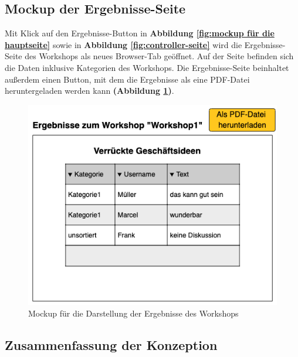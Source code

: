 \subsection{Mockup der Ergebnisse-Seite}
\label{subsec:mockup der ergebnisse-seite}
Mit Klick auf den Ergebnisse-Button in \textbf{Abbildung \ref{fig:mockup für die hauptseite}} sowie in \textbf{Abbildung \ref{fig:controller-seite}} wird die Ergebnisse-Seite des Workshops als neues Browser-Tab geöffnet. Auf der Seite befinden sich die Daten inklusive Kategorien des Workshops. Die Ergebnisse-Seite beinhaltet außerdem einen Button, mit dem die Ergebnisse als eine PDF-Datei heruntergeladen werden kann \textbf{(Abbildung \ref{fig:mockup für die darstellung der ergebnisse des workshops})}.

\begin{figure}[H]
  \begin{center}
    \includegraphics[scale=0.45]{img/ergebnisse_seite}
	\caption{Mockup für die Darstellung der Ergebnisse des Workshops}  
	\label{fig:mockup für die darstellung der ergebnisse des workshops}
  \end{center}   
\end{figure}

\subsection{Zusammenfassung der Konzeption}
\label{subsec:zusammenfassung der konzeption}

